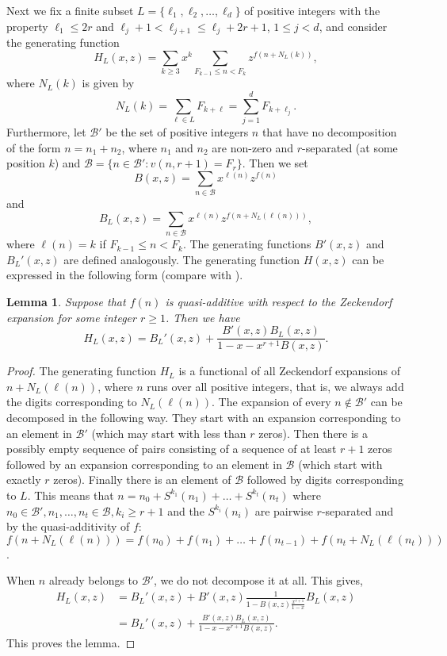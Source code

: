 \documentclass[12pt]{amsart}
\newtheorem{lemma}{Lemma}
\begin{document}
Next we fix a finite subset $L = \{\ell_1, \ell_2, \ldots, \ell_d\}$ of positive integers with the property
$\ell_1 \le 2r$ and $\ell_j + 1 < \ell_{j+1} \le \ell_j + 2r +1$, $1\le j < d$, and consider the generating function
\[
H_L(x,z) = \sum_{k\ge 3} x^k \sum_{F_{k-1} \le n < F_k} z^{f(n + N_L(k))},
\]
where $N_L(k)$ is given by
\[
N_L(k) = \sum_{\ell\in L} F_{k+\ell} = \sum_{j=1}^d F_{k+\ell_j}.
\]
Furthermore, let $\mathcal{B}'$ be the set of positive integers $n$ 
that have no decomposition of the form $n= n_1+n_2$, where $n_1$ and $n_2$ are non-zero and
$r$-separated (at some position $k$) and $\mathcal{B} = \{n \in \mathcal{B}': v(n,r+1) = F_r\}$. Then we set
\[
B(x,z) = \sum_{n\in \mathcal{B}} x^{\ell(n)} z^{f(n)}
\]
and 
\[
B_L(x,z) = \sum_{n\in \mathcal{B}} x^{\ell(n)} z^{f(n + N_L(\ell(n)))},
\]
where $\ell(n) = k$ if $F_{k-1} \le n < F_k$.
The generating functions $B'(x,z)$ and $B_L'(x,z)$ are defined analogously.
The generating function $H(x,z)$ can be expressed in the following form
(compare with \cite{KW2016}).

\begin{lemma}\label{LeHLrep}
Suppose that $f(n)$ is quasi-additive with respect to the
Zeckendorf expansion for some integer $r\ge 1$. Then we have
\[
H_L(x,z) = B_L'(x,z) + \frac{B'(x,z)B_L(x,z)}{1-x-x^{r+1} B(x,z)}.
\]
\end{lemma}

\begin{proof}
The generating function $H_L$ is a functional of all Zeckendorf expansions of 
$n + N_L(\ell(n))$,
where $n$ runs over all positive integers, that is,
we always add the digits corresponding to $N_L(\ell(n))$.
The expansion of every $n \notin \mathcal{B}'$ can be decomposed in the following way.
They start with an expansion corresponding to an element in $\mathcal{B}'$ (which may start with less than $r$ zeros).
Then there is a possibly empty sequence of pairs consisting of a sequence of at least $r+1$ zeros followed by an expansion corresponding to an element in $\mathcal{B}$ 
(which start with exactly $r$ zeros).
Finally there is an element of $\mathcal{B}$ followed by digits corresponding to $L$.
This means that $n = n_0 + S^{k_1}(n_1) + \ldots + S^{k_t}(n_t)$ where $n_0 \in \mathcal{B}', n_1,\ldots,n_{t} \in \mathcal{B}, k_i \geq r+1$ and the $S^{k_i}(n_i)$
are pairwise $r$-separated and by the quasi-additivity of $f$: $f(n+ N_L(\ell(n))) = f(n_0) + f(n_1) + \ldots + f(n_{t-1}) + f(n_{t} + N_L(\ell(n_{t})))$.

When $n$ already belongs to $\mathcal{B}'$, we do not decompose it at all.
This gives,
\begin{align*}
H_L(x,z) &= B_L'(x,z) + B'(x,z) \frac 1{1- B(x,z) \frac{x^{r+1}}{1-x} } B_L(x,z)\\
  &= B_L'(x,z) + \frac{B'(x,z) B_L(x,z)}{1-x-x^{r+1} B(x,z)}.
\end{align*}
This proves the lemma.
\end{proof}
\end{document}
